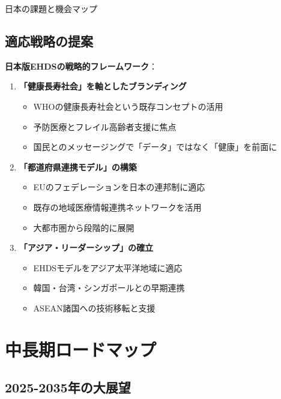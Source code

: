 \documentclass[
  a4paper,
  a4paper,
  11pt]{ltjsbook}
\providecommand{\tightlist}{%
  \setlength{\itemsep}{0pt}\setlength{\parskip}{0pt}}
\begin{document}
日本の課題と機会マップ

\subsection{適応戦略の提案}\label{ux9069ux5fdcux6226ux7565ux306eux63d0ux6848}

\textbf{日本版EHDSの戦略的フレームワーク}：

\begin{enumerate}
\def\labelenumi{\arabic{enumi}.}
\tightlist
\item
  \textbf{「健康長寿社会」を軸としたブランディング}

  \begin{itemize}
  \tightlist
  \item
    WHOの健康長寿社会という既存コンセプトの活用
  \item
    予防医療とフレイル高齢者支援に焦点
  \item
    国民とのメッセージングで「データ」ではなく「健康」を前面に
  \end{itemize}
\item
  \textbf{「都道府県連携モデル」の構築}

  \begin{itemize}
  \tightlist
  \item
    EUのフェデレーションを日本の連邦制に適応
  \item
    既存の地域医療情報連携ネットワークを活用
  \item
    大都市圏から段階的に展開
  \end{itemize}
\item
  \textbf{「アジア・リーダーシップ」の確立}

  \begin{itemize}
  \tightlist
  \item
    EHDSモデルをアジア太平洋地域に適応
  \item
    韓国・台湾・シンガポールとの早期連携
  \item
    ASEAN諸国への技術移転と支援
  \end{itemize}
\end{enumerate}

\section{中長期ロードマップ}\label{ux4e2dux9577ux671fux30edux30fcux30c9ux30deux30c3ux30d7}

\subsection{2025-2035年の大展望}\label{ux5e74ux306eux5927ux5c55ux671b}
\end{document}

